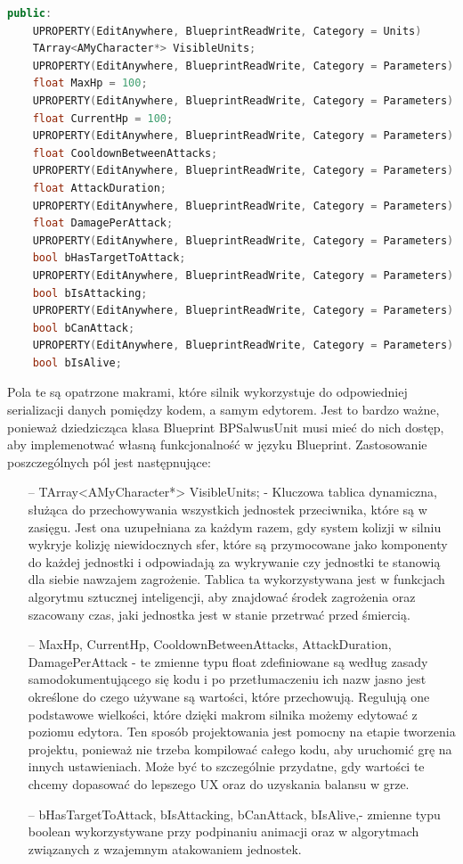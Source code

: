 \documentclass[12pt]{report}
\begin{document}
\begin{lstlisting}[language=C++, backgroundcolor=\color{black!5}, basicstyle=\footnotesize, caption=Publiczne pola klasy AMyCharacter]
public:	
	UPROPERTY(EditAnywhere, BlueprintReadWrite, Category = Units)
	TArray<AMyCharacter*> VisibleUnits;
	UPROPERTY(EditAnywhere, BlueprintReadWrite, Category = Parameters)
	float MaxHp = 100;
	UPROPERTY(EditAnywhere, BlueprintReadWrite, Category = Parameters)
	float CurrentHp = 100;
	UPROPERTY(EditAnywhere, BlueprintReadWrite, Category = Parameters)
	float CooldownBetweenAttacks;
	UPROPERTY(EditAnywhere, BlueprintReadWrite, Category = Parameters)
	float AttackDuration;
	UPROPERTY(EditAnywhere, BlueprintReadWrite, Category = Parameters)
	float DamagePerAttack;
	UPROPERTY(EditAnywhere, BlueprintReadWrite, Category = Parameters)
	bool bHasTargetToAttack;
	UPROPERTY(EditAnywhere, BlueprintReadWrite, Category = Parameters)
	bool bIsAttacking;
	UPROPERTY(EditAnywhere, BlueprintReadWrite, Category = Parameters)
	bool bCanAttack;
	UPROPERTY(EditAnywhere, BlueprintReadWrite, Category = Parameters)
	bool bIsAlive;
\end{lstlisting}

Pola te są opatrzone makrami, które silnik wykorzystuje do odpowiedniej serializacji danych pomiędzy kodem, a samym edytorem. Jest to bardzo ważne, ponieważ dziedzicząca klasa Blueprint BPSalwusUnit musi mieć do nich dostęp, aby implemenotwać własną funkcjonalność w języku Blueprint. Zastosowanie poszczególnych pól jest następnujące:
\begin{itemize}
\item[--] TArray<AMyCharacter*> VisibleUnits; - Kluczowa tablica dynamiczna, służąca do przechowywania wszystkich jednostek przeciwnika, które są w zasięgu. Jest ona uzupełniana za każdym razem, gdy system kolizji w silniu wykryje kolizję niewidocznych sfer, które są przymocowane jako komponenty do każdej jednostki i odpowiadają za wykrywanie czy jednostki te stanowią dla siebie nawzajem zagrożenie. Tablica ta wykorzystywana jest w funkcjach algorytmu sztucznej inteligencji, aby znajdować środek zagrożenia oraz szacowany czas, jaki jednostka jest w stanie przetrwać przed śmiercią.
\item[--] MaxHp, CurrentHp, CooldownBetweenAttacks, AttackDuration, DamagePerAttack - te zmienne typu float zdefiniowane są według zasady samodokumentującego się kodu i po przetłumaczeniu ich nazw jasno jest określone do czego używane są wartości, które przechowują. Regulują one podstawowe wielkości, które dzięki makrom silnika możemy edytować z poziomu edytora. Ten sposób projektowania jest pomocny na etapie tworzenia projektu, ponieważ nie trzeba kompilować całego kodu, aby uruchomić grę na innych ustawieniach. Może być to szczególnie przydatne, gdy wartości te chcemy dopasować do lepszego UX oraz do uzyskania balansu w grze.
\item[--] bHasTargetToAttack, bIsAttacking, bCanAttack, bIsAlive,- zmienne typu boolean wykorzystywane przy podpinaniu animacji oraz w algorytmach związanych z wzajemnym atakowaniem jednostek.

\end{itemize}
\end{document}
